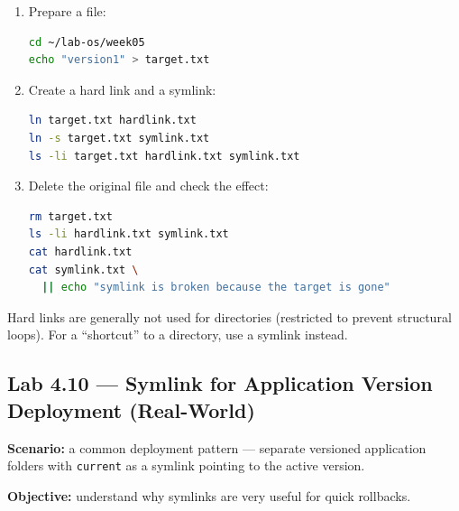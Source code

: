 \begin{enumerate}
    \item Prepare a file:
\begin{lstlisting}[language=bash, caption={Creating a source file}]
cd ~/lab-os/week05
echo "version1" > target.txt
\end{lstlisting}

    \item Create a hard link and a symlink:
\begin{lstlisting}[language=bash, caption={Creating a hard link and symlink}]
ln target.txt hardlink.txt
ln -s target.txt symlink.txt
ls -li target.txt hardlink.txt symlink.txt
\end{lstlisting}

    \item Delete the original file and check the effect:
\begin{lstlisting}[language=bash, caption={Deleting the target and checking the links}]
rm target.txt
ls -li hardlink.txt symlink.txt
cat hardlink.txt
cat symlink.txt \
  || echo "symlink is broken because the target is gone"
\end{lstlisting}
\end{enumerate}

\begin{warningbox}
Hard links are generally not used for directories (restricted to prevent
structural loops). For a ``shortcut'' to a directory, use a symlink instead.
\end{warningbox}

\subsection*{Lab 4.10 --- Symlink for Application Version Deployment (Real-World)}
\textbf{Scenario:} a common deployment pattern --- separate versioned
application folders with \texttt{current} as a symlink pointing to the active
version.

\textbf{Objective:} understand why symlinks are very useful for quick rollbacks.

